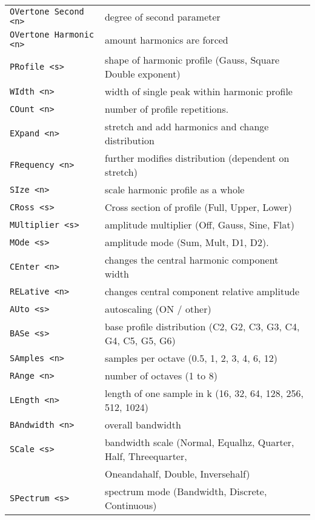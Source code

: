 \begin{table}[H]
\begin{tabular}{l l}
\texttt{OVertone Second <n>} &
   degree of second parameter\\
\texttt{OVertone Harmonic <n>} &
   amount harmonics are forced\\
\texttt{PRofile <s>} &
   shape of harmonic profile (Gauss, Square Double exponent) \\
\texttt{WIdth <n>} &
   width of single peak within harmonic profile \\
\texttt{COunt <n>} &
   number of profile repetitions. \\
\texttt{EXpand <n>} &
  stretch and add harmonics and change distribution \\
\texttt{FRequency <n>} &
   further modifies distribution (dependent on stretch) \\
\texttt{SIze <n>} &
   scale harmonic profile as a whole \\
\texttt{CRoss <s>} &
   Cross section of profile (Full, Upper, Lower) \\
\texttt{MUltiplier <s>} &
   amplitude multiplier (Off, Gauss, Sine, Flat) \\
\texttt{MOde <s>} &
   amplitude mode (Sum, Mult, D1, D2). \\
\texttt{CEnter <n>} &
   changes the central harmonic component width \\
\texttt{RELative <n>} &
   changes central component relative amplitude \\
\texttt{AUto <s>} &
   autoscaling (ON / other) \\
\texttt{BASe <s>} &
   base profile distribution (C2, G2, C3, G3, C4, G4, C5, G5, G6) \\
\texttt{SAmples <n>} &
   samples per octave (0.5, 1, 2, 3, 4, 6, 12) \\
\texttt{RAnge <n>} &
   number of octaves (1 to 8) \\
\texttt{LEngth <n>} &
   length of one sample in k (16, 32, 64, 128, 256, 512, 1024) \\
\texttt{BAndwidth <n>} &
   overall bandwidth \\
\texttt{SCale <s>} &
   bandwidth scale (Normal, Equalhz, Quarter, Half, Threequarter,\\
\texttt{} &
   Oneandahalf, Double, Inversehalf)\\
\texttt{SPectrum <s>} &
   spectrum mode (Bandwidth, Discrete, Continuous) \\
      \end{tabular}
   \end{table}


